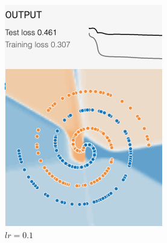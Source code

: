 \documentclass[12pt,a4paper]{article}
\begin{document}
\begin{enumerate}
\begin{figure}[H]
\begin{subfigure}[H]{0.2\textwidth}
				\includegraphics[width=\textwidth]{Figures/lr/lol}
				\caption{$lr=0.1$}
			\end{subfigure}
			\begin{subfigure}[H]{0.2\textwidth}
				\centering

\end{subfigure}
\end{figure}
\end{enumerate}
\end{document}
